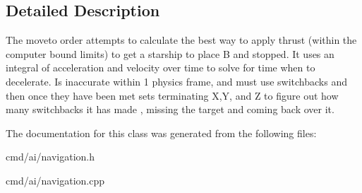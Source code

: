 \subsection{Detailed Description}
The moveto order attempts to calculate the best way to apply thrust (within the computer bound limits) to get a starship to place B and stopped. It uses an integral of acceleration and velocity over time to solve for time when to decelerate. Is inaccurate within 1 physics frame, and must use switchbacks and then once they have been met sets terminating X,Y, and Z to figure out how many switchbacks it has made , missing the target and coming back over it. 

The documentation for this class was generated from the following files\+:\begin{DoxyCompactItemize}
\item 
cmd/ai/navigation.\+h\item 
cmd/ai/navigation.\+cpp\end{DoxyCompactItemize}
